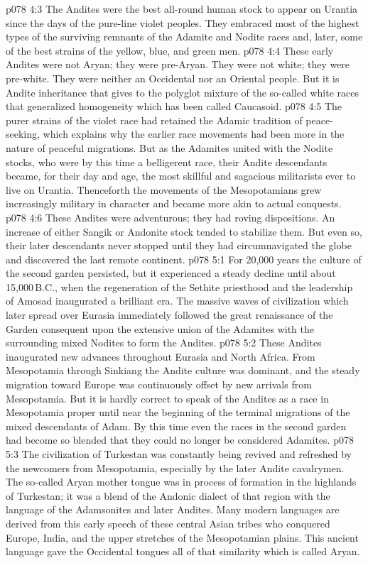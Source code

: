 \vs p078 4:3 The Andites were the best all\hyp{}round human stock to appear on Urantia since the days of the pure\hyp{}line violet peoples. They embraced most of the highest types of the surviving remnants of the Adamite and Nodite races and, later, some of the best strains of the yellow, blue, and green men.
\vs p078 4:4 \pc These early Andites were not Aryan; they were pre\hyp{}Aryan. They were not white; they were pre\hyp{}white. They were neither an Occidental nor an Oriental people. But it is Andite inheritance that gives to the polyglot mixture of the so\hyp{}called white races that generalized homogeneity which has been called Caucasoid.
\vs p078 4:5 \pc The purer strains of the violet race had retained the Adamic tradition of peace\hyp{}seeking, which explains why the earlier race movements had been more in the nature of peaceful migrations. But as the Adamites united with the Nodite stocks, who were by this time a belligerent race, their Andite descendants became, for their day and age, the most skillful and sagacious militarists ever to live on Urantia. Thenceforth the movements of the Mesopotamians grew increasingly military in character and became more akin to actual conquests.
\vs p078 4:6 These Andites were adventurous; they had roving dispositions. An increase of either Sangik or Andonite stock tended to stabilize them. But even so, their later descendants never stopped until they had circumnavigated the globe and discovered the last remote continent.
\vs p078 5:1 For 20,000 years the culture of the second garden persisted, but it experienced a steady decline until about 15,000\,B.C., when the regeneration of the Sethite priesthood and the leadership of Amosad inaugurated a brilliant era. The massive waves of civilization which later spread over Eurasia immediately followed the great renaissance of the Garden consequent upon the extensive union of the Adamites with the surrounding mixed Nodites to form the Andites.
\vs p078 5:2 These Andites inaugurated new advances throughout Eurasia and North Africa. From Mesopotamia through Sinkiang the Andite culture was dominant, and the steady migration toward Europe was continuously offset by new arrivals from Mesopotamia. But it is hardly correct to speak of the Andites as a race in Mesopotamia proper until near the beginning of the terminal migrations of the mixed descendants of Adam. By this time even the races in the second garden had become so blended that they could no longer be considered Adamites.
\vs p078 5:3 The civilization of Turkestan was constantly being revived and refreshed by the newcomers from Mesopotamia, especially by the later Andite cavalrymen. The so\hyp{}called Aryan mother tongue was in process of formation in the highlands of Turkestan; it was a blend of the Andonic dialect of that region with the language of the Adamsonites and later Andites. Many modern languages are derived from this early speech of these central Asian tribes who conquered Europe, India, and the upper stretches of the Mesopotamian plains. This ancient language gave the Occidental tongues all of that similarity which is called Aryan.
